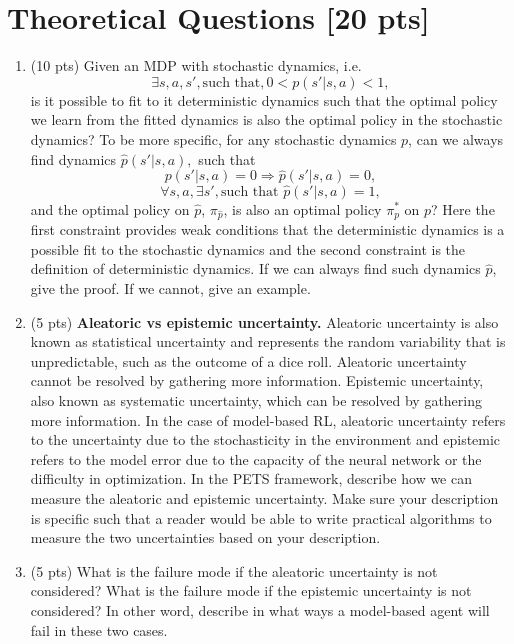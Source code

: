 \documentclass[12pt]{article}
\begin{document}
\section{Theoretical Questions [20 pts]} 
\begin{enumerate}
\item (10 pts) Given an MDP with stochastic dynamics, i.e.
$$ \exists s, a, s', \text{such that}, 0<p(s' | s, a)<1, $$ is it possible to fit to it deterministic dynamics such that the optimal policy we learn from the fitted dynamics is also the optimal policy in the stochastic dynamics? To be more specific, for any stochastic dynamics $p$, can we always find dynamics $\hat{p}(s' | s, a),$ such that
$$ p(s'|s,a)=0 \Rightarrow  \hat{p}(s'|s, a) = 0, $$
$$ \forall s, a, \exists s', \text{such that } \hat{p}(s'|s,a) =1, $$ and the optimal policy on $\hat{p}$, $\pi_{\hat{p}}$, is also an optimal policy $\pi^*_p$ on $p$? Here the first constraint provides weak conditions that the deterministic dynamics is a possible fit to the stochastic dynamics and the second constraint is the definition of deterministic dynamics. If we can always find such dynamics $\hat{p}$, give the proof. If we cannot, give an example.
\begin{solution}
\end{solution}
\item (5 pts) \textbf{Aleatoric vs epistemic uncertainty.} Aleatoric uncertainty is also known as statistical uncertainty and represents the random variability that is unpredictable, such as the outcome of a dice roll. Aleatoric uncertainty cannot be resolved by gathering more information. Epistemic uncertainty, also known as systematic uncertainty, which can be resolved by gathering more information. In the case of model-based RL, aleatoric uncertainty refers to the uncertainty due to the stochasticity in the environment and epistemic refers to the model error due to the capacity of the neural network or the difficulty in optimization. In the PETS framework, describe how we can measure the aleatoric and epistemic uncertainty. Make sure your description is specific such that a reader would be able to write practical algorithms to measure the two uncertainties based on your description.
\begin{solution}
\end{solution}
\item (5 pts) What is the failure mode if the aleatoric uncertainty is not considered? What is the failure mode if the epistemic uncertainty is not considered? In other word, describe in what ways a model-based agent will fail in these two cases.
\begin{solution}
\end{solution}

\end{enumerate}
\end{document}
